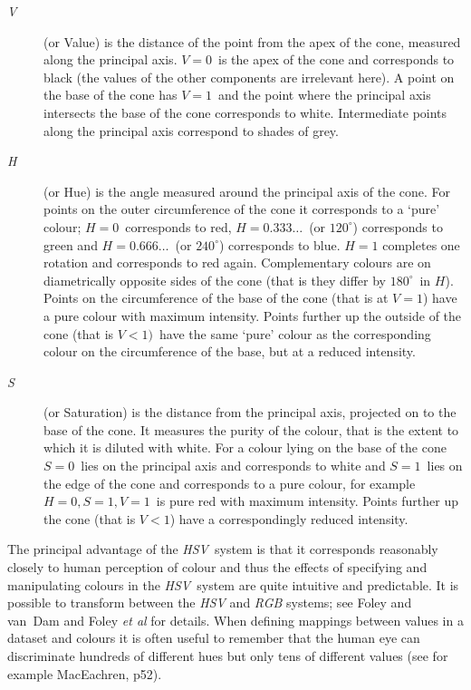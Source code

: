 \documentclass[twoside,11pt]{article}
\begin{document}
\begin{description}

  \item[{\it V}] (or Value) is the distance of the point from the
   apex of the cone, measured along the principal axis. $V=0$\, is the
   apex of the cone and corresponds to black (the values of the other
   components are irrelevant here). A point on the base of the cone has
   $V=1$\, and the point where the principal axis intersects the base
   of the cone corresponds to white. Intermediate points along the
   principal axis correspond to shades of grey.

  \item[{\it H}] (or Hue) is the angle measured around the principal
   axis of the cone. For points on the outer circumference of the
   cone it corresponds to a `pure' colour; $H=0$\, corresponds to red,
   $H=0.333\ldots$\, (or $120^{\circ}$) corresponds to green and
   $H=0.666\ldots$\, (or $240^{\circ}$) corresponds to blue. $H=1$
   completes one rotation and corresponds to red again. Complementary
   colours are on diametrically opposite sides of the cone (that is
   they differ by $180^{\circ}$\, in $H$). Points on the circumference of
   the base of the cone (that is at $V=1$) have a pure colour with maximum
   intensity. Points further up the outside of the cone (that is $V<1)$\,
   have the same `pure' colour as the corresponding colour on the
   circumference of the base, but at a reduced intensity.

  \item[{\it S}] (or Saturation) is the distance from the principal
   axis, projected on to the base of the cone. It measures the purity
   of the colour, that is the extent to which it is diluted with white.
   For a colour lying on the base of the cone $S=0$\, lies on the
   principal axis and corresponds to white and $S=1$\, lies on the edge
   of the cone and corresponds to a pure colour, for example $H=0,
   S=1, V=1$\, is pure red with maximum intensity. Points further up the
   cone (that is $V<1$) have a correspondingly reduced intensity.

\end{description}

The principal advantage of the {\it HSV}\, system is that it
corresponds reasonably closely to human perception of colour and thus
the effects of specifying and manipulating colours in the {\it HSV}\,
system are quite intuitive and predictable. It is possible to transform
between the {\it HSV} and {\it RGB} systems; see Foley and
van~Dam\cite{FOLEY1} and Foley {\it et al}\cite{FOLEY2} for details.
When defining mappings between values in a dataset and colours it is
often useful to remember that the human eye can discriminate hundreds
of different hues but only tens of different values (see for example
MacEachren\cite{MACEACHREN}, p52).
\end{document}
